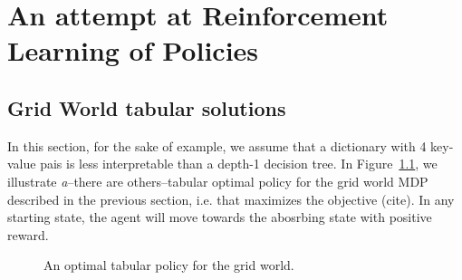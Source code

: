 \chapter{An attempt at Reinforcement Learning of Policies}
\section{Grid World tabular solutions}
In this section, for the sake of example, we assume that a dictionary with 4 key-value pais is less interpretable than a depth-1 decision tree.
In Figure~\ref{fig:optimal-policy}, we illustrate \textit{a}--there are others--tabular optimal policy for the grid world MDP described in the previous section, i.e. that maximizes the objective (cite). 
In any starting state, the agent will move towards the abosrbing state with positive reward.
\begin{figure}[ht]
\centering
{}
\caption{An optimal tabular policy for the grid world.}\label{fig:optimal-policy}
\end{figure}


